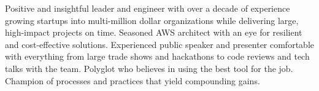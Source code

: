 

\begin{cvparagraph}

Positive and insightful leader and engineer with over a decade of experience growing startups into multi-million dollar organizations while delivering large, high-impact projects on time.
Seasoned AWS architect with an eye for resilient and cost-effective solutions.
Experienced public speaker and presenter comfortable with everything from large trade shows and hackathons to code reviews and tech talks with the team.
Polyglot who believes in using the best tool for the job.
Champion of processes and practices that yield compounding gains.
\end{cvparagraph}
